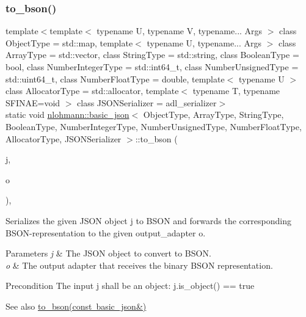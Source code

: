 \subsubsection{\texorpdfstring{to\+\_\+bson()}{to\_bson()}\hspace{0.1cm}{\footnotesize\ttfamily [2/3]}}
{\footnotesize\ttfamily template$<$template$<$ typename U, typename V, typename... Args $>$ class Object\+Type = std\+::map, template$<$ typename U, typename... Args $>$ class Array\+Type = std\+::vector, class String\+Type  = std\+::string, class Boolean\+Type  = bool, class Number\+Integer\+Type  = std\+::int64\+\_\+t, class Number\+Unsigned\+Type  = std\+::uint64\+\_\+t, class Number\+Float\+Type  = double, template$<$ typename U $>$ class Allocator\+Type = std\+::allocator, template$<$ typename T, typename S\+F\+I\+N\+A\+E=void $>$ class J\+S\+O\+N\+Serializer = adl\+\_\+serializer$>$ \\
static void \mbox{\hyperlink{classnlohmann_1_1basic__json}{nlohmann\+::basic\+\_\+json}}$<$ Object\+Type, Array\+Type, String\+Type, Boolean\+Type, Number\+Integer\+Type, Number\+Unsigned\+Type, Number\+Float\+Type, Allocator\+Type, J\+S\+O\+N\+Serializer $>$\+::to\+\_\+bson (\begin{DoxyParamCaption}\item[{const \mbox{\hyperlink{classnlohmann_1_1basic__json}{basic\+\_\+json}}$<$ Object\+Type, Array\+Type, String\+Type, Boolean\+Type, Number\+Integer\+Type, Number\+Unsigned\+Type, Number\+Float\+Type, Allocator\+Type, J\+S\+O\+N\+Serializer $>$ \&}]{j,  }\item[{\mbox{\hyperlink{classnlohmann_1_1detail_1_1output__adapter}{detail\+::output\+\_\+adapter}}$<$ uint8\+\_\+t $>$}]{o }\end{DoxyParamCaption})\hspace{0.3cm}{\ttfamily [inline]}, {\ttfamily [static]}}



Serializes the given J\+S\+ON object {\ttfamily j} to B\+S\+ON and forwards the corresponding B\+S\+O\+N-\/representation to the given output\+\_\+adapter {\ttfamily o}. 


\begin{DoxyParams}{Parameters}
{\em j} & The J\+S\+ON object to convert to B\+S\+ON. \\
\hline
{\em o} & The output adapter that receives the binary B\+S\+ON representation. \\
\hline
\end{DoxyParams}
\begin{DoxyPrecond}{Precondition}
The input {\ttfamily j} shall be an object\+: {\ttfamily j.\+is\+\_\+object() == true} 
\end{DoxyPrecond}
\begin{DoxySeeAlso}{See also}
\mbox{\hyperlink{classnlohmann_1_1basic__json_a8ca5dd4f18b59e7022b04fd9bf7f5176}{to\+\_\+bson(const basic\+\_\+json\&)}} 
\end{DoxySeeAlso}
\mbox{\label{classnlohmann_1_1basic__json_aeb988f5b2148875ed1c9cb32bec156c6}} 
